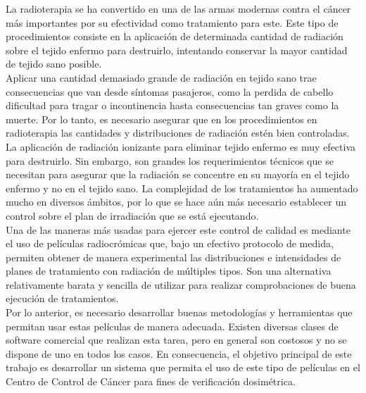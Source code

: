 La radioterapia se ha convertido en una de las armas modernas contra el cáncer más importantes por su efectividad como tratamiento para este. Este tipo de procedimientos consiste en la aplicación de determinada cantidad de radiación sobre el tejido enfermo para destruirlo, intentando conservar la mayor cantidad de tejido sano posible.\\

Aplicar una cantidad demasiado grande de radiación en tejido sano trae consecuencias que van desde síntomas pasajeros, como la perdida de cabello dificultad para tragar o incontinencia hasta consecuencias tan graves como la muerte.  Por lo tanto, es necesario asegurar que en los procedimientos en radioterapia las cantidades y distribuciones de radiación estén bien controladas.\\

La aplicación de radiación ionizante para eliminar tejido enfermo es muy efectiva para destruirlo. Sin embargo, son grandes los requerimientos técnicos que se necesitan para asegurar que la radiación se concentre en su mayoría en el tejido enfermo y no en el tejido sano. La complejidad de los tratamientos ha aumentado mucho en diversos ámbitos, por lo que se hace aún más necesario establecer un control sobre el plan de irradiación que se está ejecutando.\\

Una de las maneras más usadas para ejercer este control de calidad es mediante el uso de películas radiocrómicas que, bajo un efectivo protocolo de medida, permiten obtener de manera experimental las distribuciones e intensidades de planes de tratamiento con radiación de múltiples tipos. Son una alternativa relativamente barata y sencilla de utilizar para realizar comprobaciones de buena ejecución de tratamientos. \\

Por lo anterior, es necesario desarrollar buenas metodologías y herramientas que permitan usar estas películas de manera adecuada. Existen diversas clases de software comercial que realizan esta tarea, pero en general son costosos y no se dispone de uno en todos los casos. En consecuencia, el objetivo principal de este trabajo es desarrollar un sistema que permita el uso de este tipo de películas en el Centro de Control de Cáncer para fines de verificación dosimétrica. 